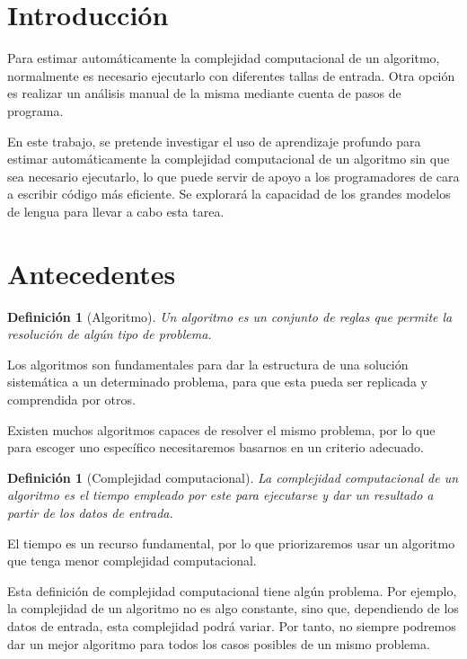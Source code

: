 \documentclass[12pt,twoside]{article}
\newtheorem{definition}[theorem]{Definición}
\begin{document}
\newpage

\tableofcontents

\newpage

\section{Introducción}\label{sec:1}

Para estimar automáticamente la complejidad computacional \cite{antecedentes} de un algoritmo, normalmente es necesario ejecutarlo con diferentes tallas de entrada. Otra opción es realizar un análisis manual de la misma mediante cuenta de pasos de programa.

En este trabajo, se pretende investigar el uso de aprendizaje profundo para estimar automáticamente la complejidad computacional de un algoritmo sin que sea necesario ejecutarlo, lo que puede servir de apoyo a los programadores de cara a escribir código más eficiente. Se explorará la capacidad de los grandes modelos de lengua \cite{libro} para llevar a cabo esta tarea.

\section{Antecedentes}
\begin{definition}[Algoritmo]
    Un algoritmo es un conjunto de reglas que permite la resolución de algún tipo de problema.
\end{definition}

Los algoritmos son fundamentales para dar la estructura de una solución sistemática a un determinado problema, para que esta pueda ser replicada y comprendida por otros.

Existen muchos algoritmos capaces de resolver el mismo problema, por lo que para escoger uno específico necesitaremos basarnos en un criterio adecuado.

\begin{definition}[Complejidad computacional]
    La complejidad computacional de un algoritmo es el tiempo empleado por este para ejecutarse y dar un resultado a partir de los datos de entrada.
\end{definition}

El tiempo es un recurso fundamental, por lo que priorizaremos usar un algoritmo que tenga menor complejidad computacional.

Esta definición de complejidad computacional tiene algún problema. Por ejemplo, la complejidad de un algoritmo no es algo constante, sino que, dependiendo de los datos de entrada, esta complejidad podrá variar. Por tanto, no siempre podremos dar un mejor algoritmo para todos los casos posibles de un mismo problema.
\end{document}
